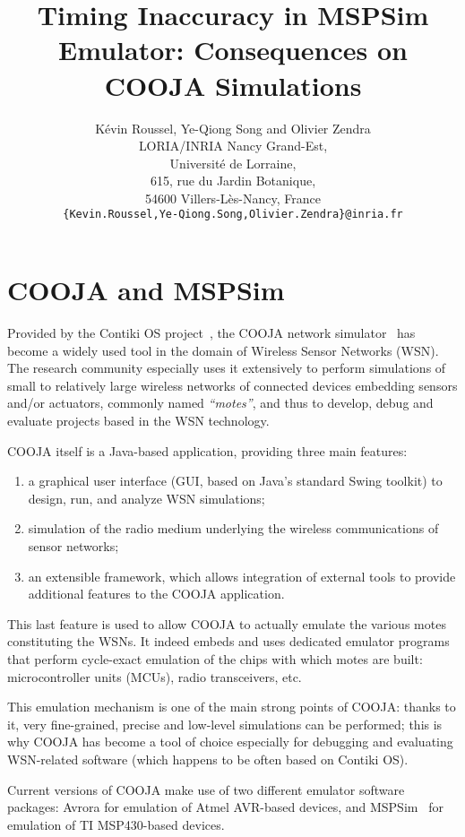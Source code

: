 \documentclass[a4paper,10pt]{article}
\title{Timing Inaccuracy in MSPSim Emulator: Consequences on COOJA Simulations}
\author{
K\'evin Roussel, Ye-Qiong Song and Olivier Zendra\\
LORIA/INRIA Nancy Grand-Est,\\
Universit\'e de Lorraine,\\
615, rue du Jardin Botanique,\\
54600 Villers-L\`es-Nancy, France\\
\texttt{\{Kevin.Roussel,Ye-Qiong.Song,Olivier.Zendra\}@inria.fr}
}
\date{}
\begin{document}
\maketitle



\section{COOJA and MSPSim}

Provided by the Contiki OS project~\cite{ContikiOS}, the COOJA network
simulator~\cite{Cooja} has become a widely used tool in the domain of
Wireless Sensor Networks (WSN). The research community especially uses
it extensively to perform simulations of small to relatively large wireless
networks of connected devices embedding sensors and/or actuators, commonly
named \emph{``motes''}, and thus to develop, debug and evaluate projects
based in the WSN technology.

COOJA itself is a Java-based application, providing three main features:
\begin{enumerate}
\item a graphical user interface (GUI, based on Java's standard Swing toolkit)
to design, run, and analyze WSN simulations;
\item simulation of the radio medium underlying the wireless communications
of sensor networks;
\item an extensible framework, which allows integration of external tools
to provide additional features to the COOJA application.
\end{enumerate}
This last feature is used to allow COOJA to actually emulate the various
motes constituting the WSNs. It indeed embeds and uses dedicated emulator
programs that perform cycle-exact emulation of the chips with which motes
are built: microcontroller units (MCUs), radio transceivers, etc.

This emulation mechanism is one of the main strong points of COOJA:
thanks to it, very fine-grained, precise and low-level simulations
can be performed; this is why COOJA has become a tool of choice especially
for debugging and evaluating WSN-related software (which happens to be
often based on Contiki OS).

Current versions of COOJA make use of two different emulator software
packages: Avrora for emulation of Atmel AVR-based devices, and
MSPSim~\cite{MSPSim} for emulation of TI MSP430-based devices.
\end{document}
